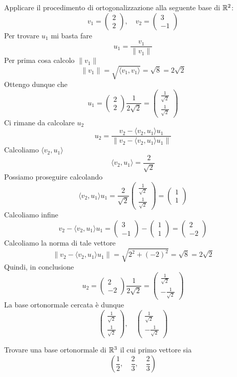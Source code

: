 \begin{example}
	Applicare il procedimento di ortogonalizzazione alla seguente base di $\mathbb{R}^2$:
	\[
		v_1 = \begin{pmatrix} 2 \\ 2 \end{pmatrix}, \quad
		v_2 = \begin{pmatrix} 3 \\ -1 \end{pmatrix}
	\]
	Per trovare $u_1$ mi basta fare
	\[
		u_1 = \frac{v_1}{\| v_1 \|}
	\]
	Per prima cosa calcolo $\| v_1 \|$
	\[ \| v_1 \| = \sqrt{\langle v_1, v_1 \rangle} = \sqrt{8} = 2 \sqrt{2} \]
	Ottengo dunque che
	\[
		u_1 = \begin{pmatrix}
			2 \\ 2
		\end{pmatrix} \frac{1}{2 \sqrt{2}} =
		\begin{pmatrix}
			\frac{1}{\sqrt{2}} \\ \frac{1}{\sqrt{2}}
		\end{pmatrix}
	\]
	Ci rimane da calcolare $u_2$
	\[
		u_2 = \frac{v_2 - \langle v_2, u_1 \rangle u_1}
		{\| v_2 - \langle v_2, u_1 \rangle u_1 \|}
	\]
	Calcoliamo $\langle v_2, u_1 \rangle$
	\[
		\langle v_2, u_1 \rangle = \frac{2}{\sqrt{2}}
	\]
	Possiamo proseguire calcolando
	\[
		\langle v_2, u_1 \rangle u_1 =
		\frac{2}{\sqrt{2}}
		\begin{pmatrix}
			\frac{1}{\sqrt{2}} \\ \frac{1}{\sqrt{2}}
		\end{pmatrix} =
		\begin{pmatrix}
			1 \\ 1
		\end{pmatrix}
	\]
	Calcoliamo infine
	\[
		v_2 - \langle v_2, u_1 \rangle u_1 =
		\begin{pmatrix} 3 \\ -1 \end{pmatrix} - \begin{pmatrix} 1 \\ 1 \end{pmatrix} =
		\begin{pmatrix} 2 \\ -2 \end{pmatrix}
	\]
	Calcoliamo la norma di tale vettore
	\[
		\| v_2 - \langle v_2, u_1 \rangle u_1 \| = \sqrt{ 2^2 + (-2)^2 } = \sqrt{8} = 2 \sqrt{2}
	\]
	Quindi, in conclusione
	\[
		u_2 = \begin{pmatrix} 2 \\ -2 \end{pmatrix} \frac{1}{2 \sqrt{2}} =
		\begin{pmatrix} \frac{1}{\sqrt{2}} \\ -\frac{1}{\sqrt{2}} \end{pmatrix}
	\]
	La base ortonormale cercata è dunque
	\[
		\begin{pmatrix} \frac{1}{\sqrt{2}} \\ \frac{1}{\sqrt{2}} \end{pmatrix}, \quad
		\begin{pmatrix} \frac{1}{\sqrt{2}} \\ -\frac{1}{\sqrt{2}} \end{pmatrix}
	\]
\end{example}

\begin{example}
	Trovare una base ortonormale di $\mathbb{R}^3$ il cui primo vettore sia
	\[ \left( \frac{1}{2}, \quad \frac{2}{3}, \quad \frac{2}{3} \right) \]
\end{example}

